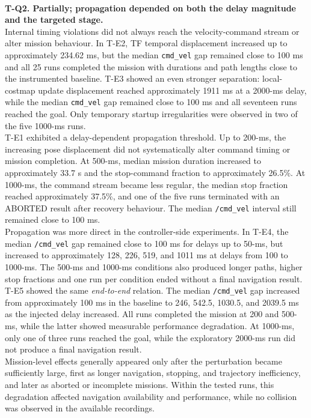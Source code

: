 \\
\noindent \textbf{T-Q2. Partially; propagation depended on both the delay magnitude and the targeted stage.}
\\
Internal timing violations did not always reach the velocity-command stream or alter mission behaviour. In T-E2, TF temporal displacement increased up to approximately 234.62 ms, but the median \texttt{cmd\_vel} gap remained close to 100 ms and all 25 runs completed the mission with durations and path lengths close to the instrumented baseline. T-E3 showed an even stronger separation: local-costmap update displacement reached approximately 1911 ms at a 2000-ms delay, while the median \texttt{cmd\_vel} gap remained close to 100 ms and all seventeen runs reached the goal. Only temporary startup irregularities were observed in two of the five 1000-ms runs.
\\
T-E1 exhibited a delay-dependent propagation threshold. Up to 200-ms, the increasing pose displacement did not systematically alter command timing or mission completion. At 500-ms, median mission duration increased to approximately 33.7 s and the stop-command fraction to approximately 26.5\%. At 1000-ms, the command stream became less regular, the median stop fraction reached approximately 37.5\%, and one of the five runs terminated with an ABORTED result after recovery behaviour. The median \texttt{/cmd\_vel} interval still remained close to 100 ms.
\\
Propagation was more direct in the controller-side experiments. In T-E4, the median \texttt{/cmd\_vel} gap remained close to 100 ms for delays up to 50-ms, but increased to approximately 128, 226, 519, and 1011 ms at delays from 100 to 1000-ms. The 500-ms and 1000-ms conditions also produced longer paths, higher stop fractions and one run per condition ended without a final navigation result.
\\
T-E5 showed the same \textit{end-to-end} relation. The median \texttt{/cmd\_vel} gap increased from approximately 100 ms in the baseline to 246, 542.5, 1030.5, and 2039.5 ms as the injected delay increased. All runs completed the mission at 200 and 500-ms, while the latter showed measurable performance degradation. At 1000-ms, only one of three runs reached the goal, while the exploratory 2000-ms run did not produce a final navigation result.
\\
Mission-level effects generally appeared only after the perturbation became sufficiently large, first as longer navigation, stopping, and trajectory inefficiency, and later as aborted or incomplete missions. Within the tested runs, this degradation affected navigation availability and performance, while no collision was observed in the available recordings.

